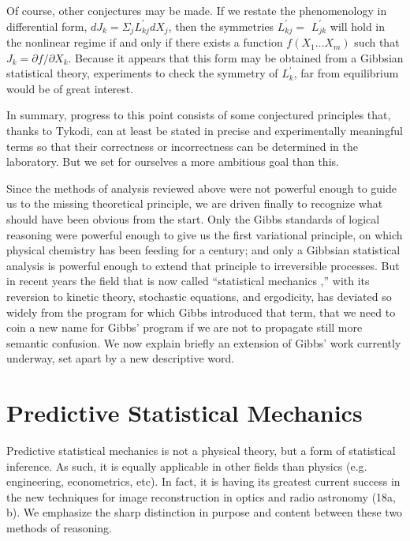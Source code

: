 \documentclass{article}
\begin{document}
Of course, other conjectures may be made. If we restate the phenomenology in differential form, $d J_k=\Sigma_j L_{k j}^{\prime} d X_j$, then the symmetries $L_{k j}^{\prime}=$ $L_{j k}^{\prime}$ will hold in the nonlinear regime if and only if there exists a function $f\left(X_1 \ldots X_m\right)$ such that $J_k=\partial f / \partial X_k$. Because it appears that this form may be obtained from a Gibbsian statistical theory, experiments to check the symmetry of $L_k^{\prime}$, far from equilibrium would be of great interest.

In summary, progress to this point consists of some conjectured principles that, thanks to Tykodi, can at least be stated in precise and experimentally meaningful terms so that their correctness or incorrectness can be determined in the laboratory. But we set for ourselves a more ambitious goal than this.

Since the methods of analysis reviewed above were not powerful enough to guide us to the missing theoretical principle, we are driven finally to recognize what should have been obvious from the start. Only the Gibbs standards of logical reasoning were powerful enough to give us the first variational principle, on which physical chemistry has been feeding for a century; and only a Gibbsian statistical analysis is powerful enough to extend that principle to irreversible processes. But in recent years the field that is now called ``statistical mechanics ,'' with its reversion to kinetic theory, stochastic equations, and ergodicity, has deviated so widely from the program for which Gibbs introduced that term, that we need to coin a new name for Gibbs' program if we are not to propagate still more semantic confusion. We now explain briefly an extension of Gibbs' work currently underway, set apart by a new descriptive word.

\section{Predictive Statistical Mechanics}

Predictive statistical mechanics is not a physical theory, but a form of statistical inference. As such, it is equally applicable in other fields than physics (e.g. engineering, econometrics, etc). In fact, it is having its greatest current success in the new techniques for image reconstruction in optics and radio astronomy (18a, b). We emphasize the sharp distinction in purpose and content between these two methods of reasoning.
\end{document}
